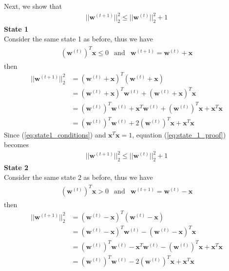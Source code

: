 Next, we show that 
\begin{align}
  ||{\textbf{w}^{(t+1)}}||_{2}^{2} \leq ||{\textbf{w}^{(t)}}||_{2}^{2} + 1
  \label{eq:induction_proof_part2}
\end{align}
\indent \textbf{State 1} \\
Consider the same state 1 as before, thus we have
\begin{align}
  \begin{matrix}
    \label{eq:state1_conditions}
    (\textbf{w}^ {(t)})^T\textbf{x} \leq 0 & \text{and} & \textbf{w}^ {(t+1)} = \textbf{w}^{(t)} + \textbf{x}
  \end{matrix}
\end{align}
then
\begin{align}
  \nonumber
  ||\textbf{w}^{(t+1)}||_{2}^{2} &= ( \textbf{w}^{(t)} + \textbf{x})^T( \textbf{w}^{(t)} + \textbf{x}) \\
  \nonumber
  &=( \textbf{w}^{(t)} + \textbf{x})^T\textbf{w}^{(t)} + ( \textbf{w}^{(t)} + \textbf{x})^T\textbf{x} \\
  \nonumber
  &= (\textbf{w}^{(t)})^T\textbf{w}^{(t)} + \textbf{x}^T\textbf{w}^{(t)} + (\textbf{w}^{(t)})^T\textbf{x} + \textbf{x}^T\textbf{x}\\
  &= (\textbf{w}^{(t)})^T\textbf{w}^{(t)} + 2 (\textbf{w}^{(t)})^T\textbf{x}  + \textbf{x}^T\textbf{x}
  \label{eq:state_1_proof}
\end{align}
Since (\ref{eq:state1_conditions}) and $\textbf{x}^T\textbf{x} = 1$, equation (\ref{eq:state_1_proof}) becomes
\begin{align}
  ||{\textbf{w}^{(t+1)}}||_{2}^{2} \leq ||{\textbf{w}^{(t)}}||_{2}^{2} + 1
\end{align}
\indent \textbf{State 2} \\
Consider the same state 2 as before, thus we have
\begin{align}
  \begin{matrix}
    \label{eq:state2_conditions}
    (\textbf{w}^ {(t)})^T\textbf{x} > 0 & \text{and} & \textbf{w}^ {(t+1)} = \textbf{w}^{(t)} - \textbf{x}
  \end{matrix}
\end{align}
then
\begin{align}
  \nonumber
  ||\textbf{w}^{(t+1)}||_{2}^{2} &= ( \textbf{w}^{(t)} - \textbf{x})^T( \textbf{w}^{(t)} - \textbf{x}) \\
  \nonumber
  &=( \textbf{w}^{(t)} - \textbf{x})^T\textbf{w}^{(t)} - ( \textbf{w}^{(t)} - \textbf{x})^T\textbf{x} \\
  \nonumber
  &= (\textbf{w}^{(t)})^T\textbf{w}^{(t)} - \textbf{x}^T\textbf{w}^{(t)} - (\textbf{w}^{(t)})^T\textbf{x} + \textbf{x}^T\textbf{x}\\
  &= (\textbf{w}^{(t)})^T\textbf{w}^{(t)} - 2 (\textbf{w}^{(t)})^T\textbf{x}  + \textbf{x}^T\textbf{x}
  \label{eq:state_2_proof}
\end{align}
